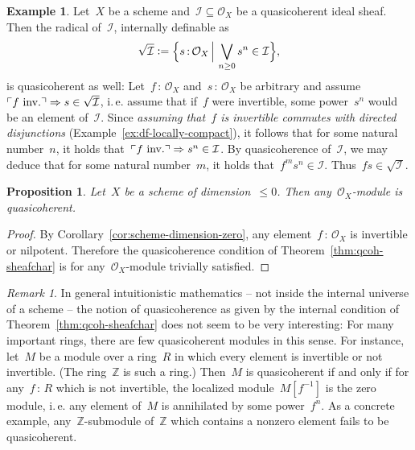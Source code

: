 \documentclass[10pt]{amsart}
\makeatletter
\theoremstyle{definition}
\newtheorem{ex}[defn]{Example}
\theoremstyle{plain}
\newtheorem{prop}[defn]{Proposition}
\theoremstyle{remark}
\newtheorem{rem}[defn]{Remark}
\newcommand{\ZZ}{\mathbb{Z}}
\renewcommand{\O}{\mathcal{O}}
\newcommand{\I}{\mathcal{I}}
\newcommand{\?}{\,{:}\,}
\renewcommand{\_}{\mathpunct{.}\,}
\newcommand{\speak}[1]{\ulcorner\text{\textnormal{#1}}\urcorner}
\newcommand{\ie}{i.\,e.\@\xspace}
\newcommand{\inv}{inv.\@}
\newcommand{\defeq}{\vcentcolon=}
\makeatother
\begin{document}
\begin{ex}\label{ex:radical-qcoh} Let~$X$ be a scheme and~$\I \subseteq \O_X$
be a quasicoherent ideal sheaf.  Then the radical of~$\I$, internally definable
as \[ \sqrt{\I} \defeq \Bigl\{ s\?\O_X \,\Big|\, \bigvee_{n \geq 0} s^n \in \I \Bigr\}, \] is
quasicoherent as well: Let~$f\?\O_X$ and~$s\?\O_X$ be arbitrary and
assume~$\speak{$f$ \inv} \Rightarrow s \in \sqrt{\I}$, \ie assume that if~$f$
were invertible, some power~$s^n$ would be an element of~$\I$. Since
\emph{assuming that~$f$ is invertible commutes with directed disjunctions}
(Example~\ref{ex:df-locally-compact}), it follows that for some natural
number~$n$, it holds that~$\speak{$f$ \inv} \Rightarrow s^n \in \I$. By
quasicoherence of~$\I$, we may deduce that for some natural number~$m$, it
holds that~$f^m s^n \in \I$. Thus~$fs \in \sqrt{\I}$.\end{ex}

\begin{prop}Let~$X$ be a scheme of dimension~$\leq 0$. Then any~$\O_X$-module
is quasicoherent.\end{prop}
\begin{proof}By Corollary~\ref{cor:scheme-dimension-zero}, any
element~$f\?\O_X$ is invertible or nilpotent. Therefore the quasicoherence
condition of Theorem~\ref{thm:qcoh-sheafchar} is for any~$\O_X$-module
trivially satisfied.
\end{proof}

\begin{rem}\label{rem:qcoh-in-constructive-mathematics}
In general intuitionistic mathematics -- not inside the internal universe of a
scheme -- the notion of quasicoherence as given by the internal condition of
Theorem~\ref{thm:qcoh-sheafchar}
does not seem to be very interesting: For many important rings, there are few
quasicoherent modules in this sense. For instance, let~$M$ be a module over a
ring~$R$ in which every element is invertible or not invertible. (The
ring~$\ZZ$ is such a ring.) Then~$M$ is quasicoherent if and only if for any~$f
\? R$ which is not invertible, the localized module~$M[f^{-1}]$ is the zero
module, \ie any element of~$M$ is annihilated by some power~$f^n$. As a
concrete example, any~$\ZZ$-submodule of~$\ZZ$ which contains a nonzero element
fails to be quasicoherent.
\end{rem}
\end{document}
